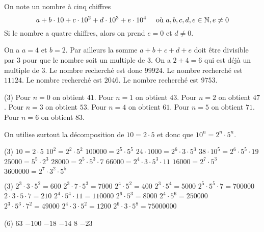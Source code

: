 \documentclass[a4paper,12pt]{report}
\begin{document}
\vspace*{-2\baselineskip}

\begin{core}
	On note un nombre à cinq chiffres  \[a+b\cdot 10+c\cdot 10^2+d\cdot 10^3+e\cdot 10^4 \quad\text{ où } a,b,c,d,e\in \mathbb N, e\neq 0\]
	Si le nombre a quatre chiffres, alors on prend $e=0$ et $d\neq 0$.

	\begin{tasks}
	\task On a $a=4$ et $b=2$. Par ailleurs la somme $a+b+c+d+e$ doit être divisible par $3$ pour que le nombre soit un multiple de $3$. On a $2+4=6$ qui est déjà un multiple de $3$. Le nombre recherché est donc $99924$. 
	\task Le nombre recherché est $11124$.
	\task Le nombre recherché est $2046$.
	\task Le nombre recherché est $9753$.
	\end{tasks}
\end{core}
\begin{core}
	\phantom{.}
	\begin{tasks}(3)
		\task[] Pour $n=0$ on obtient $41$.	
		\task[] Pour $n=1$ on obtient $43$.	
		\task[] Pour $n=2$ on obtient $47$.	
		\task[] Pour $n=3$ on obtient $53$.	
		\task[] Pour $n=4$ on obtient $61$.	
		\task[] Pour $n=5$ on obtient $71$.	
		\task[] Pour $n=6$ on obtient $83$.	
	\end{tasks}
\end{core}
\begin{core}
	On utilise surtout la décomposition de $10=2\cdot 5$ et donc que $10^n=2^n\cdot 5^n$.
	\begin{tasks}(3)
\task $10=2\cdot 5$
\task $10^2=2^2\cdot 5^2$
\task $100000=2^5\cdot 5^5$
\task $24 \cdot 1000=2^6\cdot 3\cdot 5^3$
\task $38 \cdot 10^5=2^6\cdot 5^5\cdot 19$
\task $25000=5^5\cdot 2^3$
\task $28000= 2^5\cdot 5^3\cdot 7$
\task $66000=2^4\cdot 3\cdot 5^3\cdot 11$
\task $16000=2^7\cdot 5^3$
\task $3600000=2^7\cdot 3^2\cdot 5^5$
	\end{tasks}
\end{core}
\begin{core}
	\phantom{.}
\begin{tasks}(3)
\task $2^3 \cdot 3 \cdot 5^2=600$
\task $2^3 \cdot 7 \cdot 5^3=7000$
\task $2^4 \cdot 5^2=400$
\task $2^3 \cdot 5^4=5000$
\task $2^5 \cdot 5^5 \cdot 7=700000$
\task $2 \cdot 3 \cdot 5 \cdot 7=210$
\task $2^4 \cdot 5^4 \cdot 11=110000$
\task $2^6 \cdot 5^3=8000$
\task $2^4 \cdot 5^6=250000$
\task $2^3 \cdot 5^3 \cdot 7^2=49000$
\task $2^4 \cdot 3 \cdot 5^2=1200$
\task $2^6 \cdot 3 \cdot 5^8=75000000$
\end{tasks}
\end{core}
\begin{cora}\phantom{ }

\begin{tasks}(6)
\task $63$
\task $-100$
\task $-18$
\task $-14$
\task $8$
\task $-23$
\end{tasks}

\end{cora}
\end{document}
